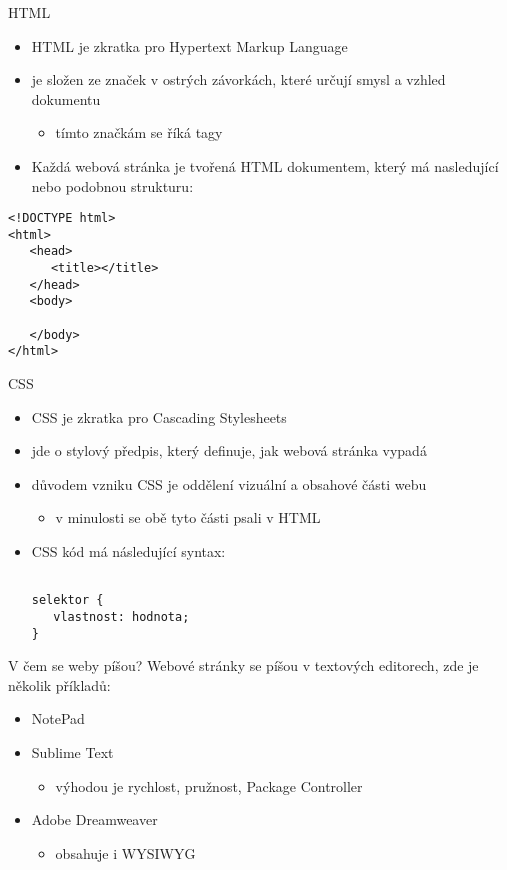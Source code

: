 \documentclass[fyma,pdf,final]{prosper}
\begin{document}
	\begin{slide}{HTML}
		\begin{itemize}
			\item HTML je zkratka pro Hypertext Markup Language
			\item je složen ze značek v ostrých závorkách, které určují smysl a vzhled dokumentu
				\begin{itemize}
					\item tímto značkám se říká tagy
				\end{itemize}
			\item Každá webová stránka je tvořená HTML dokumentem, který má nasledující nebo podobnou strukturu:
		\end{itemize}
\begin{lstlisting}[frame=single]  % Start your code-block
<!DOCTYPE html>
<html>
   <head>
      <title></title>
   </head>
   <body>

   </body>
</html>
\end{lstlisting}
	\end{slide}

	\begin{slide}{CSS}
		\begin{itemize}
			\item CSS je zkratka pro Cascading Stylesheets
			\item jde o stylový předpis, který definuje, jak webová stránka vypadá
			\item důvodem vzniku CSS je oddělení vizuální a obsahové části webu
				\begin{itemize}
					\item v minulosti se obě tyto části psali v HTML
				\end{itemize}
			\item CSS kód má následující syntax:
\begin{lstlisting}[frame=single]  % Start your code-block

selektor {
   vlastnost: hodnota;
}
\end{lstlisting}

		\end{itemize}
	\end{slide}
		
	\begin{slide}{V čem se weby píšou?}
		Webové stránky se píšou v textových editorech, zde je několik příkladů:
		\begin{itemize}
			\item NotePad
			\item Sublime Text
				\begin{itemize}
					\item výhodou je rychlost, pružnost, Package Controller
				\end{itemize}
			\item Adobe Dreamweaver
				\begin{itemize}
					\item obsahuje i WYSIWYG
				\end{itemize}
		\end{itemize}
	\end{slide}
	
\end{document}

